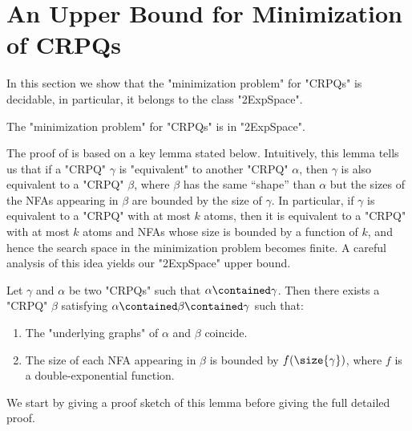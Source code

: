 \section{An Upper Bound for Minimization of CRPQs}
\AP\label{sec:upperCRPQ}
In this section we show that the "minimization problem" for "CRPQs" is decidable, in particular, it belongs to the class "2ExpSpace".

\begin{theorem}
	\AP\label{thm:2expspace-min-crpqs}
	The "minimization problem" for "CRPQs" is in "2ExpSpace".
\end{theorem}

The proof of  is based on a key lemma stated below. Intuitively, this lemma tells us that if a "CRPQ" $\gamma$ is "equivalent" to another "CRPQ" $\alpha$, then $\gamma$ is also equivalent to a "CRPQ" $\beta$, where $\beta$ has the same “shape” than $\alpha$ but the sizes of the NFAs appearing in $\beta$ are bounded by the size of $\gamma$. In particular, if $\gamma$  is equivalent to a  "CRPQ" with at most $k$ atoms, then it is equivalent to a "CRPQ" with at most $k$ atoms and NFAs whose size is bounded by a function of $k$, and hence the search space in the minimization problem becomes finite. A careful analysis of this idea yields our "2ExpSpace" upper bound.

\begin{lemma}
	\AP\label{lemma:crpq-size-bound}
	Let $\gamma$ and $\alpha$ be two "CRPQs" such that $\alpha \contained \gamma$. Then there exists a "CRPQ" $\beta$ satisfying $\alpha \contained \beta\contained \gamma$ such that:
	\begin{enumerate}
		\item The "underlying graphs" of $\alpha$ and $\beta$ coincide.
		\item The size of each NFA appearing in $\beta$ is bounded by $f(\size{\gamma})$,
			where $f$ is a double-exponential function.
	\end{enumerate}
\end{lemma}

We start by giving a proof sketch of this lemma before giving the full
detailed proof.

